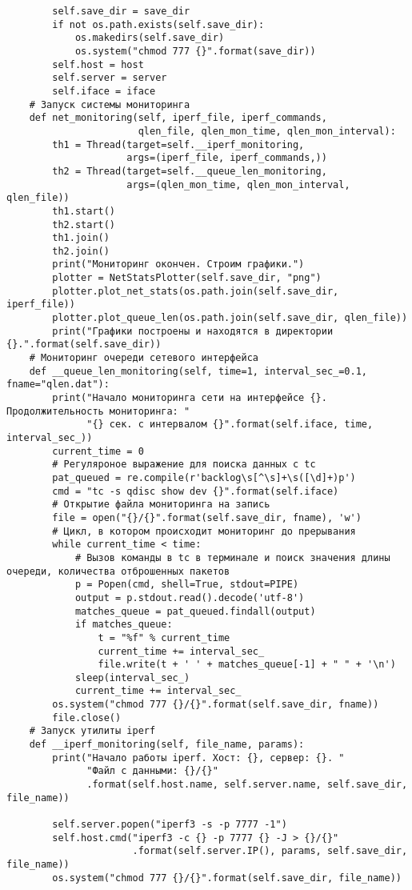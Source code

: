 \begin{verbatim}
        self.save_dir = save_dir
        if not os.path.exists(self.save_dir):
            os.makedirs(self.save_dir)
            os.system("chmod 777 {}".format(save_dir))
        self.host = host
        self.server = server
        self.iface = iface
    # Запуск системы мониторинга
    def net_monitoring(self, iperf_file, iperf_commands,
                       qlen_file, qlen_mon_time, qlen_mon_interval):
        th1 = Thread(target=self.__iperf_monitoring,
                     args=(iperf_file, iperf_commands,))
        th2 = Thread(target=self.__queue_len_monitoring,
                     args=(qlen_mon_time, qlen_mon_interval, qlen_file))
        th1.start()
        th2.start()
        th1.join()
        th2.join()
        print("Мониторинг окончен. Строим графики.")
        plotter = NetStatsPlotter(self.save_dir, "png")
        plotter.plot_net_stats(os.path.join(self.save_dir, iperf_file))
        plotter.plot_queue_len(os.path.join(self.save_dir, qlen_file))
        print("Графики построены и находятся в директории {}.".format(self.save_dir))
    # Мониторинг очереди сетевого интерфейса
    def __queue_len_monitoring(self, time=1, interval_sec_=0.1, fname="qlen.dat"):
        print("Начало мониторинга сети на интерфейсе {}. Продолжительность мониторинга: "
              "{} сек. с интервалом {}".format(self.iface, time, interval_sec_))
        current_time = 0
        # Регуляроное выражение для поиска данных с tc
        pat_queued = re.compile(r'backlog\s[^\s]+\s([\d]+)p')
        cmd = "tc -s qdisc show dev {}".format(self.iface)
        # Открытие файла мониторинга на запись
        file = open("{}/{}".format(self.save_dir, fname), 'w')
        # Цикл, в котором происходит мониторинг до прерывания
        while current_time < time:
            # Вызов команды в tc в терминале и поиск значения длины очереди, количества отброшенных пакетов
            p = Popen(cmd, shell=True, stdout=PIPE)
            output = p.stdout.read().decode('utf-8')
            matches_queue = pat_queued.findall(output)
            if matches_queue:
                t = "%f" % current_time
                current_time += interval_sec_
                file.write(t + ' ' + matches_queue[-1] + " " + '\n')
            sleep(interval_sec_)
            current_time += interval_sec_
        os.system("chmod 777 {}/{}".format(self.save_dir, fname))
        file.close()
    # Запуск утилиты iperf
    def __iperf_monitoring(self, file_name, params):
        print("Начало работы iperf. Хост: {}, сервер: {}. "
              "Файл с данными: {}/{}"
              .format(self.host.name, self.server.name, self.save_dir, file_name))

        self.server.popen("iperf3 -s -p 7777 -1")
        self.host.cmd("iperf3 -c {} -p 7777 {} -J > {}/{}"
                      .format(self.server.IP(), params, self.save_dir, file_name))
        os.system("chmod 777 {}/{}".format(self.save_dir, file_name))
\end{verbatim}

